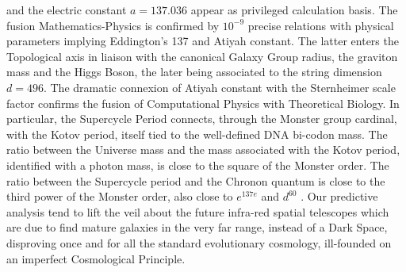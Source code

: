 and the electric constant $a = 137.036$ appear as privileged calculation basis. The fusion
Mathematics-Physics is confirmed by $10^{-9}$ precise relations with physical parameters
implying Eddington's 137 and Atiyah constant. The latter enters the Topological axis in
liaison with the canonical Galaxy Group radius, the graviton mass and the Higgs Boson,
the later being associated to the string dimension $d = 496$. The dramatic connexion of
Atiyah constant with the Sternheimer scale factor confirms the fusion of Computational
Physics with Theoretical Biology. In particular, the Supercycle Period connects, through the
Monster group cardinal, with the Kotov period, itself tied to the well-defined DNA bi-codon
mass. The ratio between the Universe mass and the mass associated with the Kotov period,
identified with a photon mass, is close to the square of the Monster order. The ratio between
the Supercycle period and the Chronon quantum is close to the third power of the Monster
order, also close to $ e^{137e}$ and $ d^{60}$ . Our predictive analysis tend to lift the veil about the future infra-red spatial telescopes
which are due to find mature galaxies in the very far range, instead of a Dark Space, disproving once and for all
the standard evolutionary cosmology, ill-founded on an imperfect Cosmological Principle.

